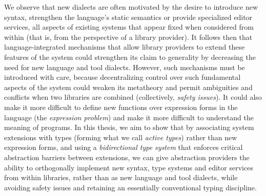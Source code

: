 We observe that new dialects are often motivated by the desire to introduce new syntax, strengthen the language's static semantics or provide specialized editor services, all aspects of existing systems that appear fixed when considered from within (that is, from the perspective of a library provider). %
It follows then that {language-integrated mechanisms} that allow library providers to extend these features of the system could strengthen its claim to generality by decreasing the need for new language and tool dialects. However, such mechanisms must be introduced with care, because decentralizing control over such fundamental aspects of the system could weaken its metatheory and permit ambiguities and conflicts when two libraries are combined (collectively, \emph{safety issues}). It could also make it more difficult to define new functions over expression forms in the language (the \emph{expression problem}) and make it more difficult to  understand the meaning of programs. 
In this thesis, we aim to show that by associating system extensions with types (forming what we call \emph{active types}) rather than new expression forms, and using a \emph{bidirectional type system} that enforces critical  abstraction barriers between extensions, we can  give abstraction providers the ability to orthogonally implement new syntax, type systems and editor services from within libraries, rather than as new language and tool dialects, while avoiding safety issues and retaining  an essentially conventional typing discipline. %

